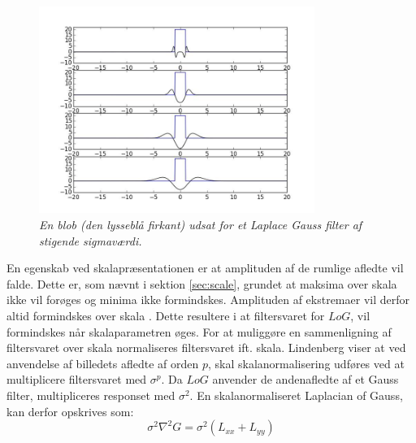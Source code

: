 \begin{figure}[H]
    \centering
    \includegraphics[width=0.80\textwidth]{fig/42.jpg}
    \vspace{-0.75em}
    \begin{center}
    \caption{{\footnotesize \textit{En blob (den lysseblå firkant) udsat for et Laplace Gauss filter af stigende sigmaværdi.
}}}
    \label{fig:laprespons}
     \end{center}
  \end{figure}
       \vspace{-2.7em}
\noindent
En egenskab ved skalapræsentationen er at amplituden af de rumlige afledte vil falde. Dette er, som nævnt i sektion \ref{sec:scale}, grundet at maksima over skala ikke vil forøges og minima ikke formindskes. Amplituden af ekstremaer vil derfor altid formindskes over skala \cite{phdlind}. Dette resultere i at filtersvaret for $LoG$, vil formindskes når skalaparametren øges. For at muliggøre en sammenligning af filtersvaret over skala normaliseres filtersvaret ift. skala.  Lindenberg \cite{lindenscale} viser at ved anvendelse af billedets afledte af orden $p$, skal skalanormalisering udføres ved at multiplicere filtersvaret med $\sigma^p$. Da $LoG$ anvender de andenafledte af et Gauss filter, multipliceres responset med $\sigma^2$. En skalanormaliseret Laplacian of Gauss, kan derfor opskrives som:
$$\sigma^2 \nabla^2G = \sigma^2(L_{xx}+L_{yy})$$
